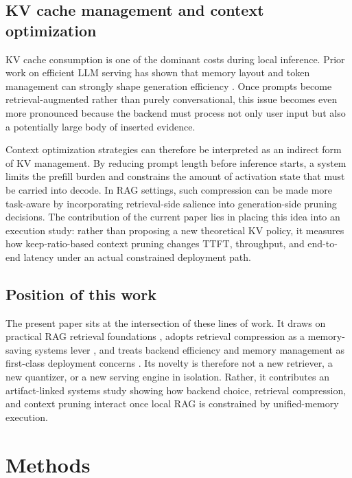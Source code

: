 \documentclass[10pt,twocolumn]{article}
\begin{document}
\subsection{KV cache management and context optimization}

KV cache consumption is one of the dominant costs during local inference. Prior work on efficient LLM serving has shown that memory layout and token management can strongly shape generation efficiency \cite{kwon2023vllm}. Once prompts become retrieval-augmented rather than purely conversational, this issue becomes even more pronounced because the backend must process not only user input but also a potentially large body of inserted evidence.

Context optimization strategies can therefore be interpreted as an indirect form of KV management. By reducing prompt length before inference starts, a system limits the prefill burden and constrains the amount of activation state that must be carried into decode. In RAG settings, such compression can be made more task-aware by incorporating retrieval-side salience into generation-side pruning decisions. The contribution of the current paper lies in placing this idea into an execution study: rather than proposing a new theoretical KV policy, it measures how keep-ratio-based context pruning changes TTFT, throughput, and end-to-end latency under an actual constrained deployment path.

\subsection{Position of this work}

The present paper sits at the intersection of these lines of work. It draws on practical RAG retrieval foundations \cite{gao2023rag,robertson2009bm25,cormack2009rrf}, adopts retrieval compression as a memory-saving systems lever \cite{zandieh2025turboquant}, and treats backend efficiency and memory management as first-class deployment concerns \cite{kwon2023vllm,hannun2023mlx}. Its novelty is therefore not a new retriever, a new quantizer, or a new serving engine in isolation. Rather, it contributes an artifact-linked systems study showing how backend choice, retrieval compression, and context pruning interact once local RAG is constrained by unified-memory execution.

\section{Methods}
\end{document}
